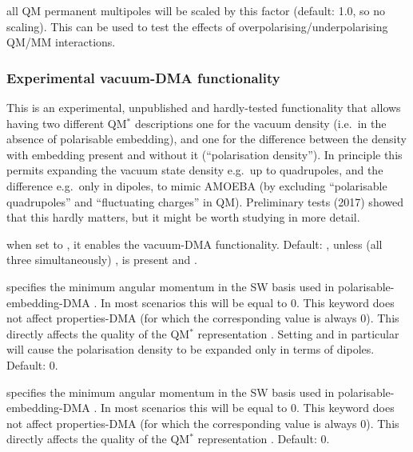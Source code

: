 \documentclass[letterpaper,10pt,english]{sphinxmanual}
\begin{document}
 \textendash{} all QM permanent multipoles will be
scaled by this factor (default: 1.0, so no scaling). This can be used to
test the effects of overpolarising/underpolarising QM/MM interactions.


\subsubsection{Experimental vacuum-DMA functionality}
\label{\detokenize{tinktep:experimental-vacuum-dma-functionality}}
This is an experimental, unpublished and hardly-tested functionality
that allows having two different QM\(^*\) descriptions \textendash{} one for
the vacuum density (i.e. in the absence of polarisable embedding), and
one for the difference between the density with embedding present and
without it (“polarisation density”). In principle this permits expanding
the vacuum state density e.g. up to quadrupoles, and the difference
e.g. only in dipoles, to mimic AMOEBA (by excluding “polarisable
quadrupoles” and “fluctuating charges” in QM). Preliminary tests (2017)
showed that this hardly matters, but it might be worth studying in more
detail.

 \textendash{} when set to , it enables the
vacuum-DMA functionality. Default: , unless (all three
simultaneously) ,
 is present and .

 \textendash{} specifies the minimum angular momentum
in the SW basis used in polarisable-embedding-DMA . In most scenarios this will be equal to 0. This keyword does
not affect properties-DMA (for which the corresponding value is always
0). This directly affects the quality of the QM\(^*\)
representation . Setting
 and  in particular will
cause the polarisation density to be expanded only in terms of dipoles.
Default: 0.

 \textendash{} specifies the minimum angular
momentum in the SW basis used in polarisable-embedding-DMA . In most scenarios this will be equal to 0. This
keyword does not affect properties-DMA (for which the corresponding
value is always 0). This directly affects the quality of the
QM\(^*\) representation . Default: 0.
\end{document}
